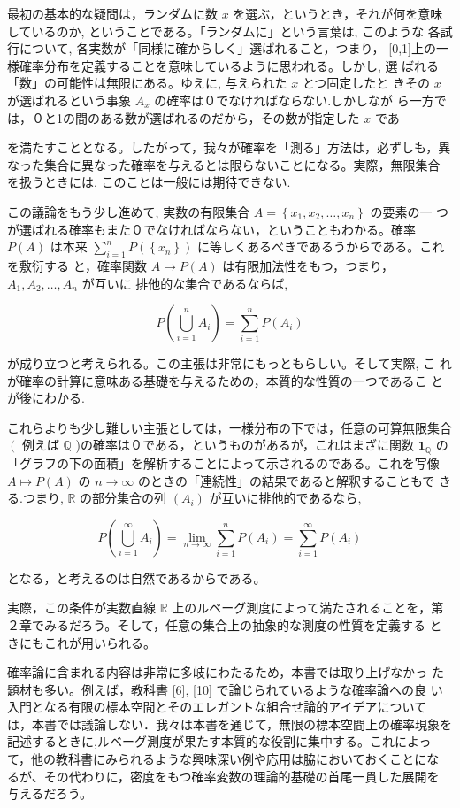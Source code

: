 \documentclass[14pt]{jsarticle}
\begin{document}
最初の基本的な疑問は，ランダムに数 $x$ を選ぶ，というとき，それが何を意味しているのか, ということである。「ランダムに」という言葉は, このような 各試行について, 各実数が「同様に確からしく」選ばれること，つまり， [0,1]上の一様確率分布を定義することを意味しているように思われる。しかし, 選 ばれる「数」の可能性は無限にある。ゆえに, 与えられた $x$ とつ固定したと きその $x$ が選ばれるという事象 $A_{x}$ の確率は０でなければならない.しかしなが ら一方では，０と1の間のある数が選ばれるのだから，その数が指定した $x$ であ


を満たすこととなる。したがって，我々が確率を「測る」方法は，必ずしも，異 なった集合に異なった確率を与えるとは限らないことになる。実際，無限集合 を扱うときには, このことは一般には期待できない.

この議論をもう少し進めて, 実数の有限集合 $A=\left\{x_{1}, x_{2}, \ldots, x_{n}\right\}$ の要素の一 つが選ばれる確率もまた０でなければならない，ということもわかる。確率 $P(A)$ は本来 $\sum_{i=1}^{n} P\left(\left\{x_{n}\right\}\right)$ に等しくあるべきであるうからである。これを敷衍する と，確率関数 $A \mapsto P(A)$ は有限加法性をもつ，つまり， $A_{1}, A_{2}, \ldots, A_{n}$ が互いに 排他的な集合であるならば,

$$
P\left(\bigcup_{i=1}^{n} A_{i}\right)=\sum_{i=1}^{n} P\left(A_{i}\right)
$$

が成り立つと考えられる。この主張は非常にもっともらしい。そして実際, こ れが確率の計算に意味ある基礎を与えるための，本質的な性質の一つであるこ とが後にわかる.

これらよりも少し難しい主張としては，一様分布の下では，任意の可算無限集合 $\left(\right.$ 例えば $\mathbb{Q}$ )の確率は０である，というものがあるが，これはまざに関数 $\mathbf{1}_{\mathbb{Q}}$ の「グラフの下の面積」を解析することによって示されるのである。これを写像 $A \mapsto P(A)$ の $n \rightarrow \infty$ のときの「連続性」の結果であると解釈することもで きる.つまり, $\mathbb{R}$ の部分集合の列 $\left(A_{i}\right)$ が互いに排他的であるなら,

$$
P\left(\bigcup_{i=1}^{\infty} A_{i}\right)=\lim _{n \rightarrow \infty} \sum_{i=1}^{n} P\left(A_{i}\right)=\sum_{i=1}^{\infty} P\left(A_{i}\right)
$$

となる，と考えるのは自然であるからである。

実際，この条件が実数直線 $\mathbb{R}$ 上のルベーグ測度によって満たされることを，第２章でみるだろう。そして，任意の集合上の抽象的な測度の性質を定義する ときにもこれが用いられる。

確率論に含まれる内容は非常に多岐にわたるため，本書では取り上げなかっ た題材も多い。例えば，教科書 [6], [10] で論じられているような確率論への良 い入門となる有限の標本空間とそのエレガントな組合せ論的アイデアについて は，本書では議論しない．我々は本書を通じて，無限の標本空間上の確率現象を 記述するときに,ルベーグ測度が果たす本質的な役割に集中する。これによっ て，他の教科書にみられるような興味深い例や応用は脇においておくことにな るが、その代わりに，密度をもつ確率変数の理論的基礎の首尾一貫した展開を 与えるだろう。
\end{document}
